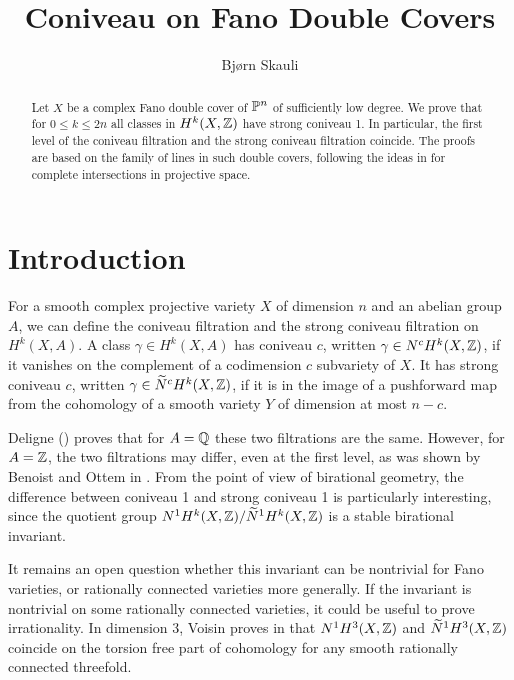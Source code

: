 \title{Coniveau on Fano Double Covers}
\author{Bjørn Skauli}
\date{}
\maketitle
\label{pap:coniveaudoublecovers}

\begin{abstract}
Let $X$ be a complex Fano double cover of $\P^n$ of sufficiently low degree. We prove that for $0 \leq k \leq 2n$ all classes in $H^k(X,\Z)$ have strong coniveau 1. In particular, the first level of the coniveau filtration and the strong coniveau filtration coincide. The proofs are based on the family of lines in such double covers, following the ideas in \cite[Theorem 1.13]{VoisinConiveauThreefolds} for complete intersections in projective space.
\end{abstract}

\section{Introduction}

For a smooth complex projective variety $X$ of dimension $n$ and an abelian group $A$, we can define the coniveau filtration and the strong coniveau filtration on $H^k(X,A)$. A class $\gamma \in H^k(X,A)$ has coniveau $c$, written $\gamma \in N^cH^k(X,\Z)$, if it vanishes on the complement of a codimension $c$ subvariety of $X$. It has strong coniveau $c$,  written $\gamma \in \widetilde{N}^cH^k(X,\Z)$, if it is in the image of a pushforward map from the cohomology of a smooth variety $Y$ of dimension at most $n-c$.

Deligne (\cite[Corollaire 8.2.8, Remarque 8.2.9]{DeligneHodgeTheory}) proves that for $A=\Q$ these two filtrations are the same. However, for $A=\Z$, the two filtrations may differ, even at the first level, as was shown by Benoist and Ottem in \cite[Theorem 1.1]{BenoistOttemConiveau}. From the point of view of birational geometry, the difference between coniveau 1 and strong coniveau 1 is particularly interesting, since the quotient group $N^1H^k(X,\Z) / \widetilde{N}^1H^k(X,\Z)$ is a stable birational invariant.

It remains an open question whether this invariant can be nontrivial for Fano varieties, or rationally connected varieties more generally. If the invariant is nontrivial on some rationally connected varieties, it could be useful to prove irrationality. In dimension 3, Voisin proves in \cite{VoisinConiveauThreefolds} that $N^1H^3(X,\Z)$ and $\widetilde{N}^1H^3(X,\Z)$ coincide on the torsion free part of cohomology for any smooth rationally connected threefold. 

